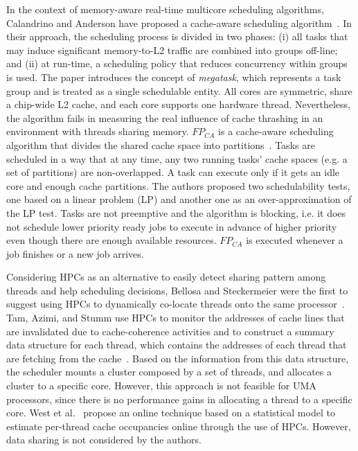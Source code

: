 \documentclass[conference]{IEEEtran}
\begin{document}
In the context of memory-aware real-time multicore scheduling algorithms, Calandrino and Anderson have proposed a cache-aware scheduling algorithm~\cite{Anderson2006, Anderson2008}. In their approach, the scheduling process is divided in two phases: (i) all tasks that may induce significant memory-to-L2 traffic are combined into groups off-line; and (ii) at run-time, a scheduling policy that reduces concurrency within groups is used. The paper introduces the concept of \emph{megatask}, which represents a task group and is treated as a single schedulable entity. All cores are symmetric, share a chip-wide L2 cache, and each core supports one hardware thread. Nevertheless, the algorithm fails in measuring the real influence of cache thrashing in an environment with threads sharing memory. $FP_{CA}$ is a cache-aware scheduling algorithm that divides the shared cache space into partitions~\cite{Guan2009}. Tasks are scheduled in a way that at any time, any two running tasks' cache spaces (e.g. a set of partitions) are non-overlapped. A task can execute only if it gets an idle core and enough cache partitions. The authors proposed two schedulability tests, one based on a linear problem (LP) and another one as an over-approximation of the LP test. Tasks are not preemptive and the algorithm is blocking, i.e. it does not schedule lower priority ready jobs to execute in advance of higher priority even though there are enough available resources. $FP_{CA}$ is executed whenever a job finishes or a new job arrives. 

Considering HPCs as an alternative to easily detect sharing pattern among threads and help scheduling decisions, Bellosa and Steckermeier were the first to suggest using HPCs to dynamically co-locate threads onto the same processor~\cite{Bellosa:1996}. Tam, Azimi, and Stumm use HPCs to monitor the addresses of cache lines that are invalidated due to cache-coherence activities and to construct a summary data structure for each thread, which contains the addresses of each thread that are fetching from the cache~\cite{Tam:2007}. Based on the information from this data structure, the scheduler mounts a cluster composed by a set of threads, and allocates a cluster to a specific core. However, this approach is not feasible for UMA processors, since there is no performance gains in allocating a thread to a specific core. West et al.~\cite{West:2010} propose an online technique based on a statistical model to estimate per-thread cache occupancies online through the use of HPCs. However, data sharing is not considered by the authors.
\end{document}

